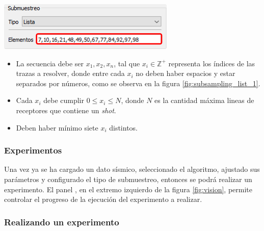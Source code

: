 \documentclass[12pt,twoside,letter]{ol-softwaremanual}
\newcommand*\circled[1]{\tikz[baseline=(char.base)]{
            \node[shape=circle,draw,inner sep=2pt] (char) {#1};}}
\newenvironment{Figure}
  {\par\medskip\noindent\minipage{\linewidth}}
  {\endminipage\par\medskip}
\begin{document}
\begin{multicols}{2}

\begin{Figure}
	\vspace{5mm}
	\centering
	\includegraphics[width=1\linewidth]{subsampling-list-1.png}
	\label{fig:subsampling_list_1}
\end{Figure}

\begin{itemize}
	\setlength\itemsep{0em}
    \item La secuencia debe ser $x_1,x_2,x_n$, tal que $x_i \in \mathbb{Z}^+$ representa los índices de las trazas a resolver, donde entre cada $x_i$ no deben haber espacios y estar separados por números, como se observa en la figura \ref{fig:subsampling_list_1}.
    \item Cada $x_i$ debe cumplir $0 \leq x_i \leq N$, donde $N$ es la cantidad máxima lineas de receptores que contiene un \emph{shot}.
    \item Deben haber mínimo siete $x_i$ distintos.
\end{itemize}

\end{multicols}

\subsubsection{Experimentos}
\label{sec:experiment}

Una vez ya se ha cargado un dato sísmico, seleccionado el algoritmo, ajustado sus parámetros y configurado el tipo de submuestreo, entonces se podrá realizar un experimento. El panel \circled{5}, en el extremo izquierdo de la figura \ref{fig:vision}, permite controlar el progreso de la ejecución del experimento a realizar.
\newpage
\subsubsection*{Realizando un experimento}
\end{document}
